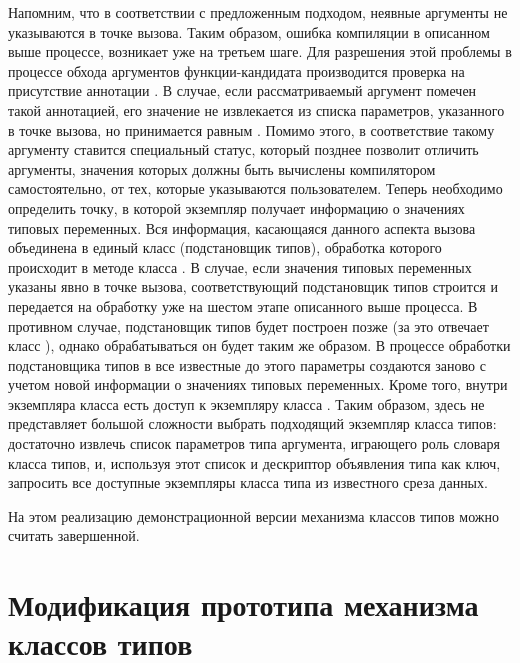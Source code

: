 Напомним, что в соответствии с предложенным подходом, неявные аргументы не указываются в точке вызова. Таким образом, ошибка компиляции в описанном выше процессе, возникает уже на третьем шаге. Для разрешения этой проблемы в процессе обхода аргументов функции-кандидата производится проверка на присутствие аннотации . В случае, если рассматриваемый аргумент помечен такой аннотацией, его значение не извлекается из списка параметров, указанного в точке вызова, но принимается равным . Помимо этого, в соответствие такому аргументу ставится специальный статус, который позднее позволит отличить аргументы, значения которых должны быть вычислены компилятором самостоятельно, от тех, которые указываются пользователем. Теперь необходимо определить точку, в которой экземпляр  получает информацию о значениях типовых переменных. Вся информация, касающаяся данного аспекта вызова объединена в единый класс  (подстановщик типов), обработка которого происходит в методе  класса . В случае, если значения типовых переменных указаны явно в точке вызова, соответствующий подстановщик типов строится и передается на обработку уже на шестом этапе описанного выше процесса. В противном случае, подстановщик типов будет построен позже (за это отвечает класс ), однако обрабатываться он будет таким же образом. В процессе обработки подстановщика типов в  все известные до этого параметры создаются заново с учетом новой информации о значениях типовых переменных. Кроме того, внутри экземпляра класса  есть доступ к экземпляру класса . Таким образом, здесь не представляет большой сложности выбрать подходящий экземпляр класса типов: достаточно извлечь список параметров типа аргумента, играющего роль словаря класса типов, и, используя этот список и дескриптор объявления типа как ключ, запросить все доступные экземпляры класса типа из известного среза данных.    

На этом реализацию демонстрационной версии механизма классов типов можно считать завершенной. 

\section{Модификация прототипа механизма классов типов}

